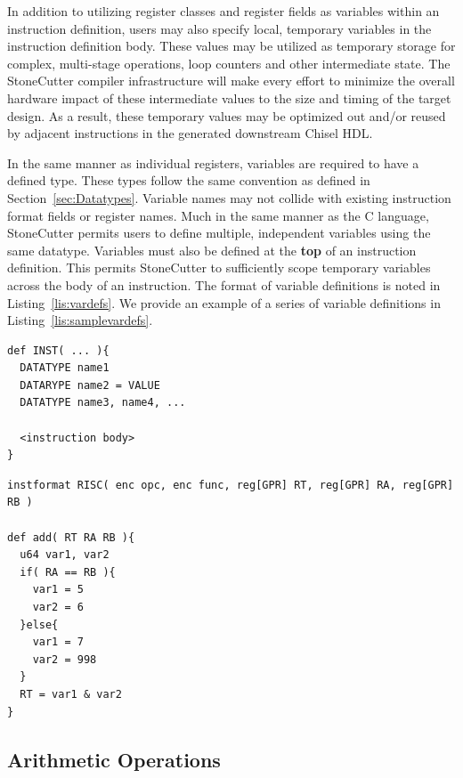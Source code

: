 \documentclass{article}
\begin{document}
In addition to utilizing register classes and register fields as variables within 
an instruction definition, users may also specify local, temporary variables 
in the instruction definition body.  These values may be utilized as temporary 
storage for complex, multi-stage operations, loop counters and other intermediate 
state.  The StoneCutter compiler infrastructure will make every effort to minimize the overall 
hardware impact of these intermediate values to the size and timing of the target design.  As a result, 
these temporary values may be optimized out and/or reused by adjacent instructions 
in the generated downstream Chisel HDL.  

In the same manner as individual registers, variables are required to have a defined type.  
These types follow the same convention as defined in Section~\ref{sec:Datatypes}.  Variable 
names may not collide with existing instruction format fields or register names.  Much in the same 
manner as the C language, StoneCutter permits users to define multiple, independent variables 
using the same datatype.  Variables must also be defined at the \textbf{top} of an instruction 
definition.  This permits StoneCutter to sufficiently scope temporary variables across the body 
of an instruction.  The format of 
variable definitions is noted in Listing~\ref{lis:vardefs}.  We provide an example of a series of 
variable definitions in Listing~\ref{lis:samplevardefs}.  

\vspace{0.125in}
\begin{lstlisting}[frame=single,style=base,caption={Variable Definitions},captionpos=b,label={lis:vardefs}]
def INST( ... ){
  DATATYPE name1
  DATARYPE name2 = VALUE
  DATATYPE name3, name4, ...

  <instruction body>
}
\end{lstlisting}

\vspace{0.125in}
\begin{lstlisting}[frame=single,style=base,caption={Sample Variable Definitions},captionpos=b,label={lis:samplevardefs}]
instformat RISC( enc opc, enc func, reg[GPR] RT, reg[GPR] RA, reg[GPR] RB )

def add( RT RA RB ){
  u64 var1, var2
  if( RA == RB ){
    var1 = 5
    var2 = 6
  }else{
    var1 = 7
    var2 = 998
  }
  RT = var1 & var2
}
\end{lstlisting}

\clearpage
\subsection{Arithmetic Operations}
\label{sec:Arithmetic Operations}
\end{document}
